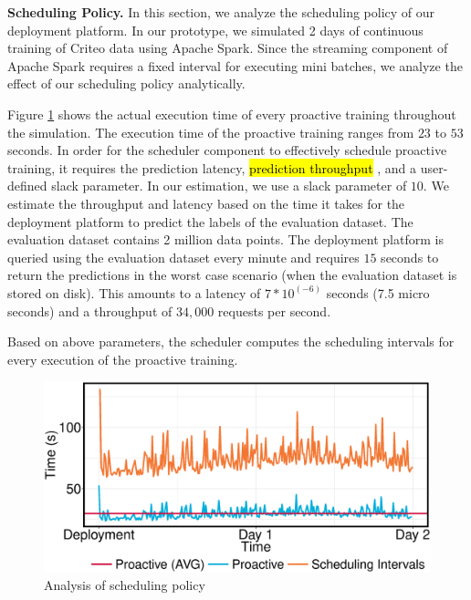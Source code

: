 \textbf{Scheduling Policy. }
In this section, we analyze the scheduling policy of our deployment platform.
In our prototype, we simulated 2 days of continuous training of Criteo data using Apache Spark.
Since the streaming component of Apache Spark requires a fixed interval for executing mini batches, we analyze the effect of our scheduling policy analytically.

Figure \ref{fig:scheduling-policy-time} shows the actual execution time of every proactive training throughout the simulation.
The execution time of the proactive training ranges from $23$ to $53$ seconds.
In order for the scheduler component to effectively schedule proactive training, it requires the prediction latency, \hl{prediction throughput} , and a user-defined slack parameter.
In our estimation, we use a slack parameter of $10$.
We estimate the throughput and latency based on the time it takes for the deployment platform to predict the labels of the evaluation dataset.
The evaluation dataset contains 2 million data points.
The deployment platform is queried using the evaluation dataset every minute and requires $15$ seconds to return the predictions in the worst case scenario (when the evaluation dataset is stored on disk). 
This amounts to a latency of $7 * 10 ^ {(-6)}$ seconds (7.5 micro seconds) and a throughput of $34,000$ requests per second.

Based on above parameters, the scheduler computes the scheduling intervals for every execution of the proactive training.

\begin{figure}[h!]
\centering
\includegraphics[width=\columnwidth]{../images/experiment-results/criteo-scheduling-experiment.eps}
\caption{Analysis of scheduling policy}
\label{fig:scheduling-policy-time}
\vspace{2mm}
\end{figure}

